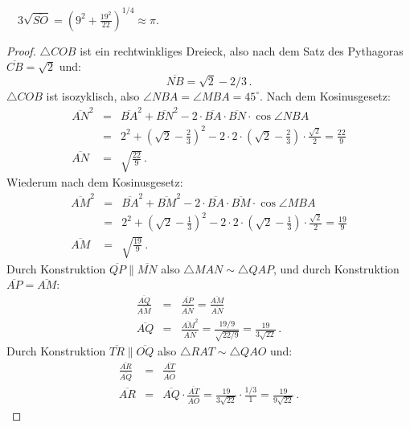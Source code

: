 \begin{theorem}\label{thm.ramanujan2}
$\quad 3\sqrt{\overline{SO}}=\left(9^2+\displaystyle\frac{19^2}{22}\right)^{1/4}\approx \pi$.
\end{theorem}
\begin{proof}
$\triangle COB$ ist ein rechtwinkliges Dreieck, also nach dem Satz des Pythagoras $\overline{CB}=\sqrt{2}$ und:
\[
\overline{NB}=\sqrt{2}-2/3\,.
\]
$\triangle COB$ ist isozyklisch, also $\angle NBA =\angle MBA=45^\circ$. Nach dem Kosinusgesetz:
\begin{eqnarray*}
\overline{AN}^2&=&\overline{BA}^2 + \overline{BN}^2-2\cdot\overline{BA}\cdot\overline{BN}\cdot\cos \angle NBA\\
&=&2^2+\left(\sqrt{2}-\frac{2}{3}\right)^2-2\cdot 2 \cdot \left(\sqrt{2}-\frac{2}{3}\right)\cdot \frac{\sqrt{2}}{2}
=\frac{22}{9}\\
\overline{AN}&=&\sqrt{\frac{22}{9}}\,.
\end{eqnarray*}
Wiederum nach dem Kosinusgesetz:
\begin{eqnarray*}
\overline{AM}^2&=&\overline{BA}^2 + \overline{BM}^2-2\cdot\overline{BA}\cdot\overline{BM}\cdot\cos \angle MBA\\
&=&2^2+\left(\sqrt{2}-\frac{1}{3}\right)^2-2\cdot 2 \cdot \left(\sqrt{2}-\frac{1}{3}\right)\cdot \frac{\sqrt{2}}{2}
=\frac{19}{9}\\
\overline{AM}&=&\sqrt{\frac{19}{9}}\,.
\end{eqnarray*}
Durch Konstruktion $\overline{QP}\parallel  \overline{MN}$ also
$\triangle MAN\sim \triangle QAP$, und durch Konstruktion $\overline{AP}=\overline{AM}$:
\begin{eqnarray*}
\frac{\overline{AQ}}{\overline{AM}}&=&\frac{\overline{AP}}{\overline{AN}}=\frac{\overline{AM}}{\overline{AN}}\\
\overline{AQ}&=&\frac{\overline{AM}^2}{\overline{AN}}=\frac{19/9}{\sqrt{22/9}}=\frac{19}{3\sqrt{22}}\,.
\end{eqnarray*}
Durch Konstruktion $\overline{TR}\parallel  \overline{OQ}$ also
$\triangle RAT\sim \triangle QAO$ und:
\begin{eqnarray*}
\frac{\overline{AR}}{\overline{AQ}}&=&\frac{\overline{AT}}{\overline{AO}}\\
\overline{AR}&=&\overline{AQ}\cdot\frac{\overline{AT}}{\overline{AO}}=\frac{19}{3\sqrt{22}}\cdot\frac{1/3}{1}=\frac{19}{9\sqrt{22}}\,.
\end{eqnarray*}


\end{proof}
